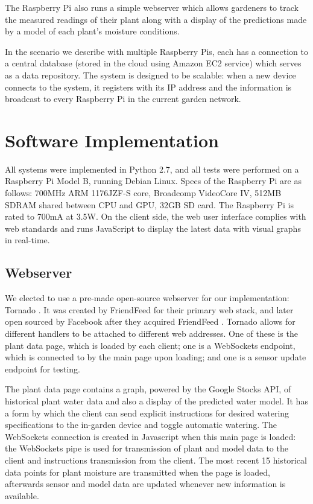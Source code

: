 \documentclass[a4paper]{acm_proc_article-sp}
\begin{document}
The Raspberry Pi also runs a simple webserver which allows gardeners to track the measured readings of their plant along with a display of the predictions made by a model of each plant's moisture conditions.

In the scenario we describe with multiple Raspberry Pis, each has a connection to a central database (stored in the cloud using Amazon EC2 service) which serves as a data repository. The system is designed to be scalable: when a new device connects to the system, it registers with its IP address and the information is broadcast to every Raspberry Pi in the current garden network. 

\section{Software Implementation}

All systems were implemented in Python 2.7, and all tests were performed on a Raspberry Pi Model B, running Debian Linux.  Specs of the Raspberry Pi are as follows: 700MHz ARM 1176JZF-S core, Broadcomp VideoCore IV, 512MB SDRAM shared between CPU and GPU, 32GB SD card.  The Raspberry Pi is rated to 700mA at 3.5W.  On the client side, the web user interface complies with web standards and runs JavaScript to display the latest data with visual graphs in real-time.

\subsection{Webserver}

We elected to use a pre-made open-source webserver for our implementation: Tornado \cite{Tornado}.  It was created by FriendFeed for their primary web stack, and later open sourced by Facebook after they acquired FriendFeed \cite{TornadoAnnounce}.  Tornado allows for different handlers to be attached to different web addresses.  One of these is the plant data page, which is loaded by each client; one is a WebSockets endpoint, which is connected to by the main page upon loading; and one is a sensor update endpoint for testing.

The plant data page contains a graph, powered by the Google Stocks API, of historical plant water data and also a display of the predicted water model.  It has a form by which the client can send explicit instructions for desired watering specifications to the in-garden device and toggle automatic watering.  The WebSockets connection is created in Javascript when this main page is loaded: the WebSockets pipe is used for transmission of plant and model data to the client and instructions transmission from the client.  The most recent 15 historical data points for plant moisture are transmitted when the page is loaded, afterwards sensor and model data are updated whenever new information is available.
\end{document}
